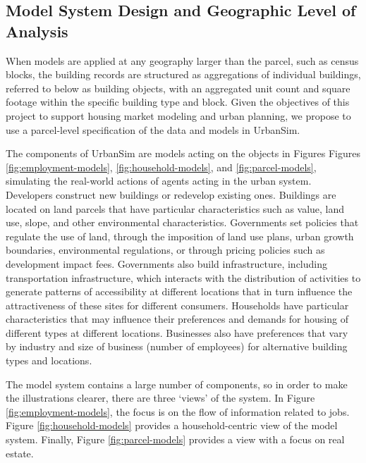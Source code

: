 \subsection{Model System Design and Geographic Level of Analysis}



When models are applied at any geography larger than the parcel, such as census blocks, the building records are structured as aggregations of individual buildings, referred to below as building objects, with an aggregated unit count and square footage within the specific building type and block. Given the objectives of this project to support housing market modeling and urban planning, we propose to use a parcel-level specification of the data and models in UrbanSim.  




The components of UrbanSim are models acting on the objects in Figures Figures \ref{fig:employment-models}, \ref{fig:household-models}, and \ref{fig:parcel-models}, simulating the real-world actions of agents acting in the urban system.  Developers construct new buildings or redevelop existing ones.  Buildings are located on land parcels that have particular characteristics such as value, land use, slope, and other environmental characteristics.  Governments set policies that regulate the use of land, through the imposition of land use plans, urban growth boundaries, environmental regulations, or through pricing policies such as development impact fees.  Governments also build infrastructure, including transportation infrastructure, which interacts with the distribution of activities to generate patterns of accessibility at different locations that in turn influence the attractiveness of these sites for different consumers.  Households have particular characteristics that may influence their preferences and demands for housing of different types at different locations.  Businesses also have preferences that vary by industry and size of business (number of employees) for alternative building types and locations.



The model
system contains a large number of components, so in order to make the illustrations clearer,
there are three `views' of the system.  In Figure \ref{fig:employment-models}, the focus is on the
flow of information related to jobs.  Figure \ref{fig:household-models} provides a household-centric
view of the model system.  Finally, Figure \ref{fig:parcel-models} provides a view with a focus on
real estate.

